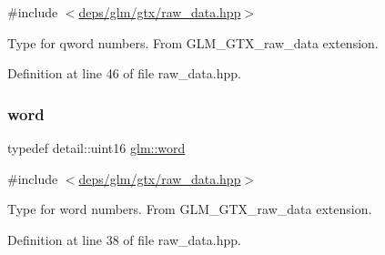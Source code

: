 {\ttfamily \#include $<$\hyperlink{raw__data_8hpp}{deps/glm/gtx/raw\+\_\+data.\+hpp}$>$}

Type for qword numbers. From G\+L\+M\+\_\+\+G\+T\+X\+\_\+raw\+\_\+data extension. 

Definition at line 46 of file raw\+\_\+data.\+hpp.

\mbox{\label{group__gtx__raw__data_ga5617a479d471021b5c773c5e969ba46d}} 
\subsubsection{\texorpdfstring{word}{word}}
{\footnotesize\ttfamily typedef detail\+::uint16 \hyperlink{group__gtx__raw__data_ga5617a479d471021b5c773c5e969ba46d}{glm\+::word}}



{\ttfamily \#include $<$\hyperlink{raw__data_8hpp}{deps/glm/gtx/raw\+\_\+data.\+hpp}$>$}

Type for word numbers. From G\+L\+M\+\_\+\+G\+T\+X\+\_\+raw\+\_\+data extension. 

Definition at line 38 of file raw\+\_\+data.\+hpp.

